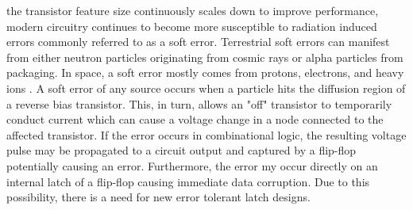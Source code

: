 
% 
 the transistor feature size continuously scales down to improve performance, modern circuitry continues to become more susceptible to radiation induced errors commonly referred to as a soft error. Terrestrial soft errors can manifest from either neutron particles originating from cosmic rays or alpha particles from packaging. In space, a soft error mostly comes from protons, electrons, and heavy ions \cite{Zick2008, Schwank2013}. A soft error of any source occurs when a particle hits the diffusion region of a reverse bias transistor. This, in turn, allows an "off" transistor to temporarily conduct current which can cause a voltage change in a node connected to the affected transistor. If the error occurs in combinational logic, the resulting voltage pulse may be propagated to a circuit output and captured by a flip-flop potentially causing an error. Furthermore, the error my occur directly on an internal latch of a flip-flop causing immediate data corruption. Due to this possibility, there is a need for new error tolerant latch designs.

